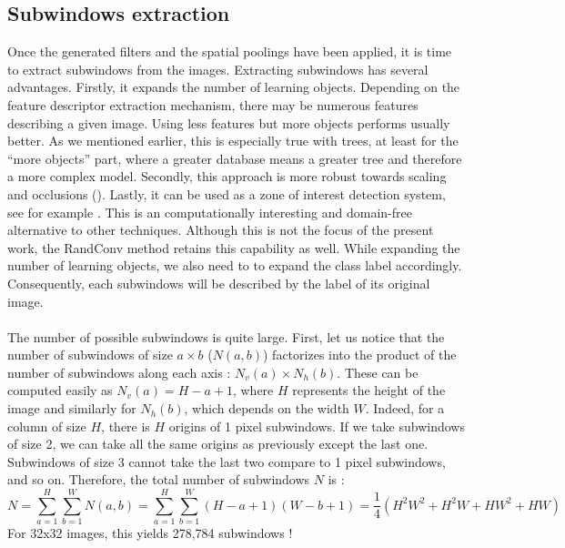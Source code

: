 \documentclass[a4paper]{report}
\newlength{\larg}
\begin{document}
		\subsection{Subwindows extraction}
		Once the generated filters and the spatial poolings have been applied, it is time to extract subwindows from the images. Extracting subwindows has several advantages. 
		Firstly, it expands the number of learning objects. Depending on the feature descriptor extraction mechanism, there may be numerous features describing a given image. Using less features but more objects performs usually better. As we mentioned earlier, this is especially true with trees, at least for the ``more objects'' part, where a greater database means a greater tree and therefore a more complex model.
		Secondly, this approach is more robust towards scaling and occlusions (\cite{pxitrecap}).
		Lastly, it can be used as a zone of interest detection system, see for example \cite{mareebiological}. This is an computationally interesting and domain-free alternative to other techniques. Although this is not the focus of the present work, the RandConv method retains this capability as well.
		While expanding the number of learning objects, we also need to to expand the class label accordingly. Consequently, each subwindows will be described by the label of its original image.
		
		\paragraph{}
		The number of possible subwindows is quite large. %
		First, let us notice that the number of subwindows of size $a \times b$ ($N(a,b)$) factorizes into the product of the number of subwindows along each axis : $N_v(a) \times N_h(b)$. These can be computed easily as $N_v(a) = H - a + 1$, where $H$ represents the height of the image and similarly for $N_h(b)$, which depends on the width $W$. Indeed, for a column of size $H$, there is $H$ origins of 1 pixel subwindows. If we take subwindows of size 2, we can take all the same origins as previously except the last one. Subwindows of size 3 cannot take the last two compare to 1 pixel subwindows, and so on.
		Therefore, the total number of subwindows $N$ is :
		\[
			N = \sum_{a=1}^H \sum_{b=1}^W N(a,b) = \sum_{a=1}^H \sum_{b=1}^W (H-a+1)(W-b+1) = \frac{1}{4}(H^2W^2 + H^2 W + H W^2 + HW)
		\]
		For 32x32 images, this yields 278,784 subwindows !
		
\end{document}
